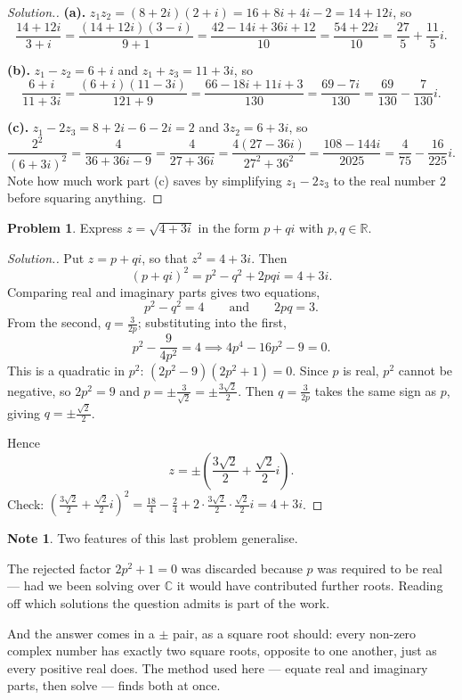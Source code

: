 \documentclass[11pt,a4paper]{article}
\theoremstyle{definition}
\newtheorem{note}[thm]{Note}
\newtheorem{problemx}{Problem}[section]
\newenvironment{problem}{\begin{problemx}}{\end{problemx}}
\newenvironment{solution}
  {\renewcommand{\qedsymbol}{}\begin{proof}[\textit{Solution}.]}
  {\end{proof}}
\begin{document}
\begin{solution}
\textbf{(a).} $z_1z_2=(8+2i)(2+i)=16+8i+4i-2=14+12i$, so
$$\frac{14+12i}{3+i}=\frac{(14+12i)(3-i)}{9+1}
=\frac{42-14i+36i+12}{10}=\frac{54+22i}{10}=\frac{27}{5}+\frac{11}{5}i .$$

\textbf{(b).} $z_1-z_2=6+i$ and $z_1+z_3=11+3i$, so
$$\frac{6+i}{11+3i}=\frac{(6+i)(11-3i)}{121+9}
=\frac{66-18i+11i+3}{130}=\frac{69-7i}{130}=\frac{69}{130}-\frac{7}{130}i .$$

\textbf{(c).} $z_1-2z_3=8+2i-6-2i=2$ and $3z_2=6+3i$, so
$$\frac{2^{2}}{(6+3i)^{2}}=\frac{4}{36+36i-9}=\frac{4}{27+36i}
=\frac{4(27-36i)}{27^{2}+36^{2}}=\frac{108-144i}{2025}
=\frac{4}{75}-\frac{16}{225}i .$$
Note how much work part (c) saves by simplifying $z_1-2z_3$ to the real number $2$
before squaring anything.
\end{solution}

\begin{problem}
Express $z=\sqrt{4+3i}$ in the form $p+qi$ with $p,q\in\mathbb{R}$.
\end{problem}

\begin{solution}
Put $z=p+qi$, so that $z^{2}=4+3i$. Then
$$(p+qi)^{2}=p^{2}-q^{2}+2pqi=4+3i .$$
Comparing real and imaginary parts gives two equations,
$$p^{2}-q^{2}=4 \qquad \text{and}\qquad  2pq=3 .$$
From the second, $q=\frac{3}{2p}$; substituting into the first,
$$p^{2}-\frac{9}{4p^{2}}=4 \implies 4p^{4}-16p^{2}-9=0 .$$
This is a quadratic in $p^{2}$: $\left(2p^{2}-9\right)\left(2p^{2}+1\right)=0$.
Since $p$ is real, $p^{2}$ cannot be negative, so $2p^{2}=9$ and
$p=\pm\frac{3}{\sqrt{2}}=\pm\frac{3\sqrt{2}}{2}$. Then $q=\frac{3}{2p}$ takes
the same sign as $p$, giving $q=\pm\frac{\sqrt{2}}{2}$.

Hence
$$z=\pm\left(\frac{3\sqrt{2}}{2}+\frac{\sqrt{2}}{2}i\right).$$
Check: $\left(\frac{3\sqrt{2}}{2}+\frac{\sqrt{2}}{2}i\right)^{2}
=\frac{18}{4}-\frac{2}{4}+2\cdot\frac{3\sqrt{2}}{2}\cdot\frac{\sqrt{2}}{2}i=4+3i$.
\end{solution}

\begin{note}
Two features of this last problem generalise.

The rejected factor $2p^{2}+1=0$ was discarded because $p$ was required to be
real --- had we been solving over $\mathbb{C}$ it would have contributed further
roots. Reading off which solutions the question admits is part of the work.

And the answer comes in a $\pm$ pair, as a square root should: every non-zero
complex number has exactly two square roots, opposite to one another, just as
every positive real does. The method used here --- equate real and imaginary parts,
then solve --- finds both at once.
\end{note}
\end{document}
